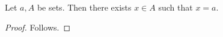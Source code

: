 \begin{proposition}\label{obvious_witness_missing_evidence}
    Let $a,A$ be sets.
    Then there exists $x\in A$ such that $x=a$.
\end{proposition}
\begin{proof}
    Follows.
\end{proof}
